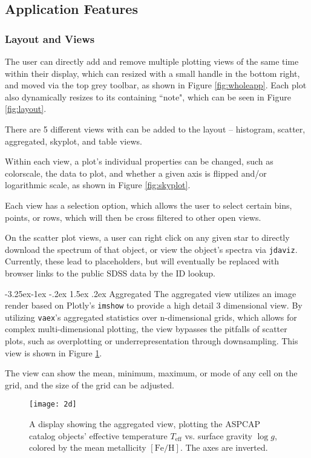 \documentclass[a4paper,10pt,twocolumn]{article}
\makeatletter
\renewcommand\paragraph{\@startsection{paragraph}{4}{\z@}%
	{-3.25ex\@plus -1ex \@minus -.2ex}%
	{1.5ex \@plus .2ex}%
	{\normalfont\normalsize\bfseries}}
\newcommand{\vaex}{\texttt{vaex}}
\makeatother
\begin{document}
\subsection{Application Features}
\label{sec:features}
\subsubsection{Layout and Views}
\label{sec:sticky}
The user can directly add and remove multiple plotting views of the same time within their display, which can resized with a small handle in the bottom right, and moved via the top grey toolbar, as shown in Figure \ref{fig:wholeapp}. Each plot also dynamically resizes to its containing ``note", which can be seen in Figure \ref{fig:layout}.

There are 5 different views with can be added to the layout -- histogram, scatter, aggregated, skyplot, and table views.

Within each view, a plot's individual properties can be changed, such as colorscale, the data to plot, and whether a given axis is flipped and/or logarithmic scale, as shown in Figure \ref{fig:skyplot}.

Each view has a selection option, which allows the user to select certain bins, points, or rows, which will then be cross filtered to other open views.

On the scatter plot views, a user can right click on any given star to directly download the spectrum of that object, or view the object's spectra via \texttt{jdaviz}. Currently, these lead to placeholders, but will eventually be replaced with browser links to the public SDSS data by the ID lookup.

\paragraph{Aggregated}
\label{sec:aggregated}
The aggregated view utilizes an image render based on Plotly's \texttt{imshow} to provide a high detail 3 dimensional view. By utilizing \vaex's aggregated statistics over n-dimensional grids, which allows for complex multi-dimensional plotting, the view bypasses the pitfalls of scatter plots, such as overplotting or underrepresentation through downsampling. This view is shown in Figure \ref{fig:2d}.

The view can show the mean, minimum, maximum, or mode of any cell on the grid, and the size of the grid can be adjusted.

\begin{figure}[tp]
	\centering
	\texttt{[image: 2d]}
	\caption{A display showing the aggregated view, plotting the ASPCAP catalog objects' effective temperature $T_{\mathrm{eff} }$ vs. surface gravity $\log g$, colored by the mean metallicity $\mathrm{[Fe / H]} $. The axes are inverted.}
	\label{fig:2d}
\end{figure}
\end{document}
